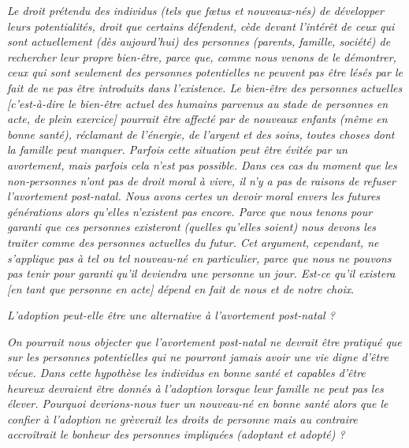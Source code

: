 \begin{displayquote}
\emph{Le droit prétendu des individus (tels que fœtus et nouveaux-nés) de développer leurs potentialités, droit que certains défendent, cède devant l'intérêt de ceux qui sont actuellement (dès aujourd'hui) des personnes (parents, famille, société) de rechercher leur propre bien-être, parce que, comme nous venons de le démontrer, ceux qui sont seulement des personnes potentielles ne peuvent pas être lésés par le fait de ne pas être introduits dans l'existence. Le bien-être des personnes actuelles \emph{[c'est-à-dire le bien-être actuel des humains parvenus au stade de personnes en acte, de plein exercice]} pourrait être affecté par de nouveaux enfants (même en bonne santé), réclamant de l'énergie, de l'argent et des soins, toutes choses dont la famille peut manquer. Parfois cette situation peut être évitée par un avortement, mais parfois cela n'est pas possible. Dans ces cas du moment que les non-personnes n'ont pas de droit moral à vivre, il n'y a pas de raisons de refuser l'avortement post-natal. Nous avons certes un devoir moral envers les futures générations alors qu'elles n'existent pas encore. Parce que nous tenons pour garanti que ces personnes existeront (quelles qu'elles soient) nous devons les traiter comme des personnes actuelles du futur. Cet argument, cependant, ne s'applique pas à tel ou tel nouveau-né en particulier, parce que nous ne pouvons pas tenir pour garanti qu'il deviendra une personne un jour. Est-ce qu'il existera \emph{[en tant que personne en acte]} dépend en fait de nous et de notre choix}.

\emph{L'adoption peut-elle être une alternative à l'avortement post-natal ?}

\emph{On pourrait nous objecter que l'avortement post-natal ne devrait être pratiqué que sur les personnes potentielles qui ne pourront jamais avoir une vie digne d'être vécue. Dans cette hypothèse les individus en bonne santé et capables d'être heureux devraient être donnés à l'adoption lorsque leur famille ne peut pas les élever. Pourquoi devrions-nous tuer un nouveau-né en bonne santé alors que le confier à l'adoption ne grèverait les droits de personne mais au contraire accroîtrait le bonheur des personnes impliquées (adoptant et adopté) ?}


\end{displayquote}
